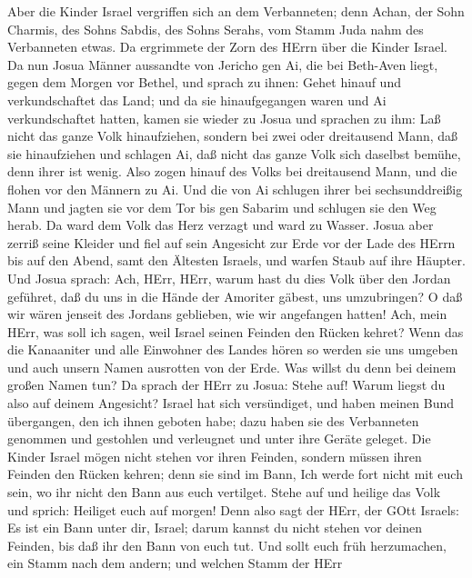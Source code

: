  Aber die Kinder Israel vergriffen sich an dem Verbanneten;
denn Achan, der Sohn Charmis, des Sohns Sabdis, des Sohns Serahs, vom
Stamm Juda nahm des Verbanneten etwas. Da ergrimmete der Zorn des HErrn
über die Kinder Israel.  Da nun Josua Männer aussandte von
Jericho gen Ai, die bei Beth-Aven liegt, gegen dem Morgen vor Bethel,
und sprach zu ihnen: Gehet hinauf und verkundschaftet das Land; und da
sie hinaufgegangen waren und Ai verkundschaftet hatten, 
kamen sie wieder zu Josua und sprachen zu ihm: Laß nicht das ganze Volk
hinaufziehen, sondern bei zwei oder dreitausend Mann, daß sie
hinaufziehen und schlagen Ai, daß nicht das ganze Volk sich daselbst
bemühe, denn ihrer ist wenig.  Also zogen hinauf des Volks
bei dreitausend Mann, und die flohen vor den Männern zu Ai. 
Und die von Ai schlugen ihrer bei sechsunddreißig Mann und jagten sie
vor dem Tor bis gen Sabarim und schlugen sie den Weg herab. Da ward dem
Volk das Herz verzagt und ward zu Wasser.  Josua aber zerriß
seine Kleider und fiel auf sein Angesicht zur Erde vor der Lade des
HErrn bis auf den Abend, samt den Ältesten Israels, und warfen Staub auf
ihre Häupter.  Und Josua sprach: Ach, HErr, HErr, warum hast
du dies Volk über den Jordan geführet, daß du uns in die Hände der
Amoriter gäbest, uns umzubringen? O daß wir wären jenseit des Jordans
geblieben, wie wir angefangen hatten!  Ach, mein HErr, was
soll ich sagen, weil Israel seinen Feinden den Rücken kehret?
 Wenn das die Kanaaniter und alle Einwohner des Landes hören
so werden sie uns umgeben und auch unsern Namen ausrotten von der Erde.
Was willst du denn bei deinem großen Namen tun?  Da sprach
der HErr zu Josua: Stehe auf! Warum liegst du also auf deinem Angesicht?
 Israel hat sich versündiget, und haben meinen Bund
übergangen, den ich ihnen geboten habe; dazu haben sie des Verbanneten
genommen und gestohlen und verleugnet und unter ihre Geräte geleget.
 Die Kinder Israel mögen nicht stehen vor ihren Feinden,
sondern müssen ihren Feinden den Rücken kehren; denn sie sind im Bann,
Ich werde fort nicht mit euch sein, wo ihr nicht den Bann aus euch
vertilget.  Stehe auf und heilige das Volk und sprich:
Heiliget euch auf morgen! Denn also sagt der HErr, der GOtt Israels: Es
ist ein Bann unter dir, Israel; darum kannst du nicht stehen vor deinen
Feinden, bis daß ihr den Bann von euch tut.  Und sollt euch
früh herzumachen, ein Stamm nach dem andern; und welchen Stamm der HErr

